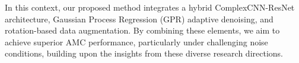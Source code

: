 \documentclass[conference]{IEEEtran}
\begin{document}
In this context, our proposed method integrates a hybrid ComplexCNN-ResNet architecture, Gaussian Process Regression (GPR) adaptive denoising, and rotation-based data augmentation. By combining these elements, we aim to achieve superior AMC performance, particularly under challenging noise conditions, building upon the insights from these diverse research directions.





\end{document}
